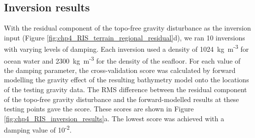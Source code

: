 
\subsection{Inversion results}

With the residual component of the topo-free gravity disturbance as the inversion input (Figure \ref{fig:chp4_RIS_terrain_regional_residual}d), we ran 10 inversions with varying levels of damping. Each inversion used a density of 1024~kg~m\textsuperscript{-3} for ocean water and 2300~kg~m\textsuperscript{-3} for the density of the seafloor. For each value of the damping parameter, the cross-validation score was calculated by forward modelling the gravity effect of the resulting bathymetry model onto the locations of the testing gravity data. The RMS difference between the residual component of the topo-free gravity disturbance and the forward-modelled results at these testing points gave the score. These scores are shown in Figure \ref{fig:chp4_RIS_inversion_results}a. The lowest score was achieved with a damping value of 10\textsuperscript{-2}. \\

